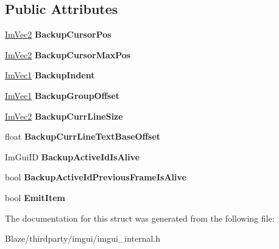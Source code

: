 \subsection*{Public Attributes}
\begin{DoxyCompactItemize}
\item 
\mbox{\label{structImGuiGroupData_a8b29e2d9081876fd4847b1cd86c60500}} 
\hyperlink{structImVec2}{Im\+Vec2} {\bfseries Backup\+Cursor\+Pos}
\item 
\mbox{\label{structImGuiGroupData_abb83c4db050ef7d20485902cc14c4a0d}} 
\hyperlink{structImVec2}{Im\+Vec2} {\bfseries Backup\+Cursor\+Max\+Pos}
\item 
\mbox{\label{structImGuiGroupData_a0eea82f9d3952d538431a23295e1beaa}} 
\hyperlink{structImVec1}{Im\+Vec1} {\bfseries Backup\+Indent}
\item 
\mbox{\label{structImGuiGroupData_aebda25ad372538e8209c8fc3df9d64aa}} 
\hyperlink{structImVec1}{Im\+Vec1} {\bfseries Backup\+Group\+Offset}
\item 
\mbox{\label{structImGuiGroupData_ae5220218236b037bce2e0775ab017f4a}} 
\hyperlink{structImVec2}{Im\+Vec2} {\bfseries Backup\+Curr\+Line\+Size}
\item 
\mbox{\label{structImGuiGroupData_a1e6ccaa9ced52afc9763ede5d9c374b8}} 
float {\bfseries Backup\+Curr\+Line\+Text\+Base\+Offset}
\item 
\mbox{\label{structImGuiGroupData_aacd18774380f912245f8be65f36889cc}} 
Im\+Gui\+ID {\bfseries Backup\+Active\+Id\+Is\+Alive}
\item 
\mbox{\label{structImGuiGroupData_afbb6878b27a6183b10af7b07fa16daa4}} 
bool {\bfseries Backup\+Active\+Id\+Previous\+Frame\+Is\+Alive}
\item 
\mbox{\label{structImGuiGroupData_ac7b2be78e0fb1f07e6c7bd564b8035d3}} 
bool {\bfseries Emit\+Item}
\end{DoxyCompactItemize}


The documentation for this struct was generated from the following file\+:\begin{DoxyCompactItemize}
\item 
Blaze/thirdparty/imgui/imgui\+\_\+internal.\+h\end{DoxyCompactItemize}
